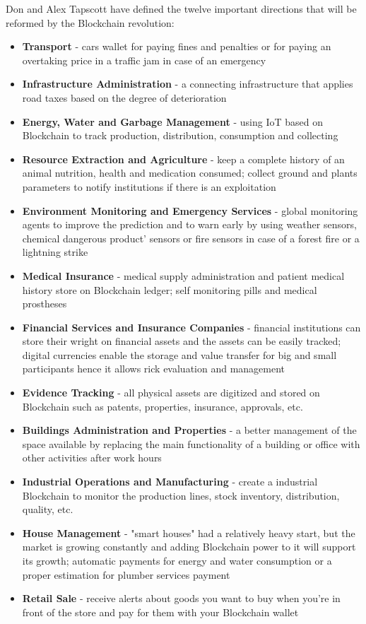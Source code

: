 Don and Alex Tapscott \cite{tapscott} have defined the twelve important directions that will be reformed by the Blockchain revolution:
\begin{itemize}
	\item \textbf{Transport} - cars wallet for paying fines and penalties or for paying an overtaking price in a traffic jam in case of an emergency
	\item \textbf{Infrastructure Administration} - a connecting infrastructure that applies road taxes based on the degree of deterioration
	\item \textbf{Energy, Water and Garbage Management} - using IoT based on Blockchain to track production, distribution, consumption and collecting
	\item \textbf{Resource Extraction and Agriculture} - keep a complete history of an animal nutrition, health and medication consumed; collect ground and plants parameters to notify institutions if there is an exploitation
	\item \textbf{Environment Monitoring and Emergency Services} - global monitoring agents to improve the prediction and to warn early by using weather sensors, chemical dangerous product' sensors or fire sensors in case of a forest fire or a lightning strike
	\item \textbf{Medical Insurance} - medical supply administration and patient medical history store on Blockchain ledger; self monitoring pills and medical prostheses
	\item \textbf{Financial Services and Insurance Companies} - financial institutions can store their wright on financial assets and the assets can be easily tracked; digital currencies enable the storage and value transfer for big and small participants hence it allows rick evaluation and management
	\item \textbf{Evidence Tracking} - all physical assets are digitized and stored on Blockchain such as patents, properties, insurance, approvals, etc.
	\item \textbf{Buildings Administration and Properties} - a better management of the space available by replacing the main functionality of a building or office with other activities after work hours 
	\item \textbf{Industrial Operations and  Manufacturing} - create a industrial Blockchain to monitor the production lines, stock inventory, distribution, quality, etc.
	\item \textbf{House Management} - "smart houses" had a relatively heavy start, but the market is growing constantly and adding Blockchain power to it will support its growth; automatic payments for energy and water consumption or a proper estimation for plumber services payment
	\item \textbf{Retail Sale} - receive alerts about goods you want to buy when you're in front of the store and pay for them with your Blockchain wallet
\end{itemize} 

